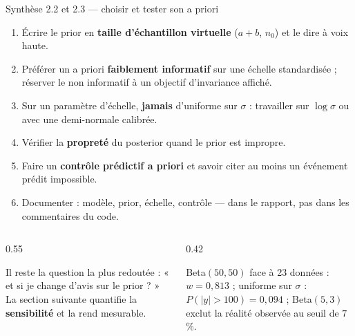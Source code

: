 \begin{frame}{Synthèse 2.2 et 2.3 — choisir et tester son a priori}
\small
\begin{kbox}
\begin{enumerate}
  \item Écrire le prior en \textbf{taille d'échantillon virtuelle} ($a+b$, $n_0$) et
        le dire à voix haute.
  \item Préférer un a priori \textbf{faiblement informatif} sur une échelle
        standardisée ; réserver le non informatif à un objectif d'invariance
        affiché.
  \item Sur un paramètre d'échelle, \textbf{jamais} d'uniforme sur $\sigma$ :
        travailler sur $\log\sigma$ ou avec une demi-normale calibrée.
  \item Vérifier la \textbf{propreté} du posterior quand le prior est impropre.
  \item Faire un \textbf{contrôle prédictif a priori} et savoir citer au moins un
        événement prédit impossible.
  \item Documenter : modèle, prior, échelle, contrôle — dans le rapport, pas dans
        les commentaires du code.
\end{enumerate}
\end{kbox}
\vspace{-2mm}
\begin{columns}[t]
\begin{column}{0.55\textwidth}
\begin{ebox}
Il reste la question la plus redoutée : « et si je change d'avis sur le prior ? »
La section suivante quantifie la \textbf{sensibilité} et la rend mesurable.
\end{ebox}
\end{column}
\begin{column}{0.42\textwidth}
\begin{wbox}
Beta$(50,50)$ face à 23 données : $w = 0{,}813$ \; ; \; uniforme sur $\sigma$ :
$P(|y| > 100) = 0{,}094$ \; ; \; Beta$(5,3)$ exclut la réalité observée au seuil de
$7$ \%.
\end{wbox}
\end{column}
\end{columns}
\end{frame}
